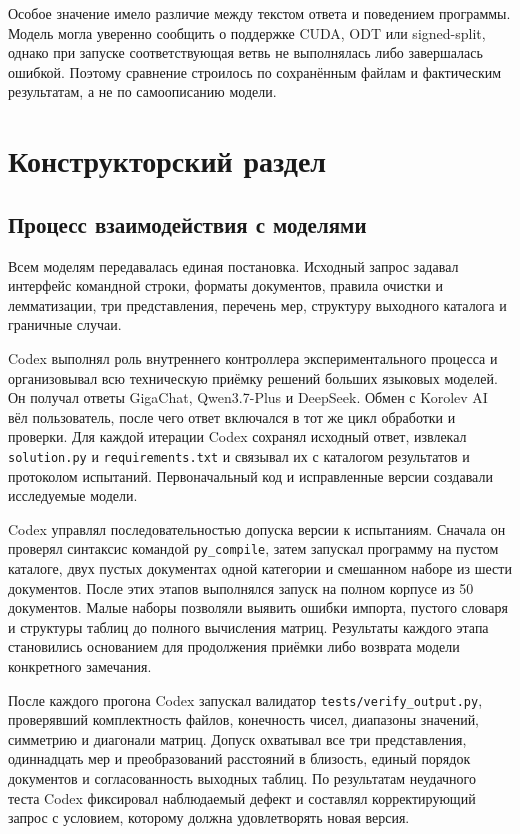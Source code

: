\documentclass[a4paper,12pt]{extreport}
\newcommand{\code}[1]{\nolinkurl{#1}}
\begin{document}
Особое значение имело различие между текстом ответа и поведением программы. Модель могла уверенно сообщить о поддержке CUDA, ODT или signed-split, однако при запуске соответствующая ветвь не выполнялась либо завершалась ошибкой. Поэтому сравнение строилось по сохранённым файлам и фактическим результатам, а не по самоописанию модели.

\chapter{Конструкторский раздел}

\section{Процесс взаимодействия с моделями}

Всем моделям передавалась единая постановка. Исходный запрос задавал интерфейс командной строки, форматы документов, правила очистки и лемматизации, три представления, перечень мер, структуру выходного каталога и граничные случаи.

Codex выполнял роль внутреннего контроллера экспериментального процесса и организовывал всю техническую приёмку решений больших языковых моделей. Он получал ответы GigaChat, Qwen3.7-Plus и DeepSeek. Обмен с Korolev AI вёл пользователь, после чего ответ включался в тот же цикл обработки и проверки. Для каждой итерации Codex сохранял исходный ответ, извлекал \code{solution.py} и \code{requirements.txt} и связывал их с каталогом результатов и протоколом испытаний. Первоначальный код и исправленные версии создавали исследуемые модели.

Codex управлял последовательностью допуска версии к испытаниям. Сначала он проверял синтаксис командой \code{py_compile}, затем запускал программу на пустом каталоге, двух пустых документах одной категории и смешанном наборе из шести документов. После этих этапов выполнялся запуск на полном корпусе из 50 документов. Малые наборы позволяли выявить ошибки импорта, пустого словаря и структуры таблиц до полного вычисления матриц. Результаты каждого этапа становились основанием для продолжения приёмки либо возврата модели конкретного замечания.

После каждого прогона Codex запускал валидатор \code{tests/verify_output.py}, проверявший комплектность файлов, конечность чисел, диапазоны значений, симметрию и диагонали матриц. Допуск охватывал все три представления, одиннадцать мер и преобразований расстояний в близость, единый порядок документов и согласованность выходных таблиц. По результатам неудачного теста Codex фиксировал наблюдаемый дефект и составлял корректирующий запрос с условием, которому должна удовлетворять новая версия.
\end{document}
